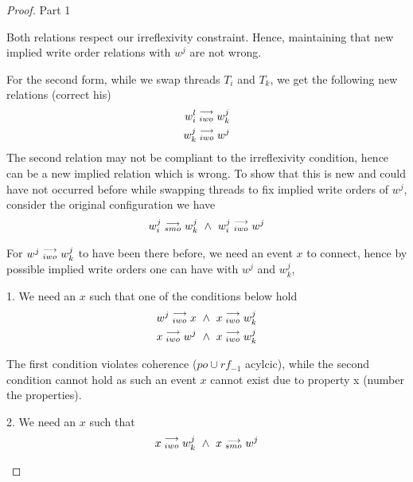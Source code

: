 \begin{proof}{Part 1}
\begin{itemize}
                        Both relations respect our irreflexivity constraint.  Hence, maintaining that new implied write order relations with $w^j$ are not wrong.

                        For the second form, while we swap threads $T_i$ and $T_k$, we get the following new relations (correct his)
                        \begin{align*}
                            w_i^l\stackrel{\longrightarrow}{_{iwo}}w_k^j \\
                            w_k^j\stackrel{\longrightarrow}{_{iwo}}w^j
                        \end{align*}
                        The second relation may not be compliant to the irreflexivity condition, hence can be a new implied relation which  is   wrong. To show that this is new and could have not occurred before while swapping threads to fix implied write  orders of  $w^j$, consider the original configuration we have 
                        \begin{align*}
                            \reln{w_i^j}{smo}{w_k^j} \ \wedge \ \reln{w_i^j}{iwo}{w^j}
                        \end{align*}

                        For $w^j\stackrel{\longrightarrow}{_{iwo}}w_k^j$ to have been there before, we need an event $x$ to connect, hence by possible implied write orders one can have with $w^j$ and $w_k^j$, 
                        
                        1. We need an $x$ such that one of the conditions below hold
                        \begin{align*}
                            \reln{w^j}{iwo}{x} \ \wedge \ \reln{x}{iwo}{w_k^j} \\ 
                            \reln{x}{iwo}{w^j} \ \wedge \ \reln{x}{iwo}{w_k^j}
                        \end{align*}

                        The first condition violates coherence ($po \cup rf_{-1}$ acylcic), while the second condition cannot hold as such an event $x$ cannot exist due to property x (number the properties).


                        2. We need an $x$ such that 
                        \begin{align*}
                            \reln{x}{iwo}{w_k^j} \ \wedge \ \reln{x}{smo}{w^j}
                        \end{align*}


\end{itemize}
\end{proof}
